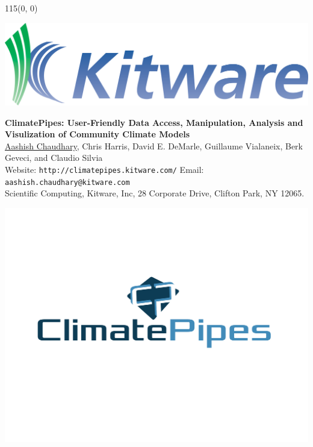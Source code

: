 \documentclass[a0,landscape]{a0poster}
\newenvironment{pcol}[1]{
  \begin{minipage}[t]{#1}
}{
  \end{minipage}
}
\newcommand{\pbox}[4]{
\begin{minipage}[t][#2][t]{#1}
#4
\end{minipage}
}%
\begin{document}
\begin{textblock}{115}(0, 0)
\begin{pcol}{\headerwidth}
\begin{minipage}[c][\headerheight][c]{0.1\textwidth}
  \begin{center}
    \includegraphics[width=1.0\textwidth]{images/Kitware}
  \end{center}
\end{minipage}
\begin{minipage}[c][\headerheight][c]{0.755\textwidth}
  \begin{center}
    {\Huge \textbf{ClimatePipes: User-Friendly Data Access, Manipulation, Analysis and Visulization of Community Climate Models}}\\[10mm]
    {\Large \underline{Aashish Chaudhary}, Chris Harris, David E. DeMarle, Guillaume Vialaneix, Berk Geveci, and Claudio Silvia}\\[6.5mm]
    {\large Website: \texttt{http://climatepipes.kitware.com/}\hspace*{1.5cm} Email: \texttt{aashish.chaudhary@kitware.com}}\\[6.5mm]
    {\large Scientific Computing, Kitware, Inc, 28 Corporate Drive, Clifton Park, NY 12065.}
  \end{center}
\end{minipage}
\begin{minipage}[c][\headerheight][c]{0.1\textwidth}
  \begin{center}
    \includegraphics[width=1.5\textwidth]{images/ClimatePipes_Logo}
  \end{center}
\end{minipage}
\end{pcol}
\end{textblock}
\end{document}
